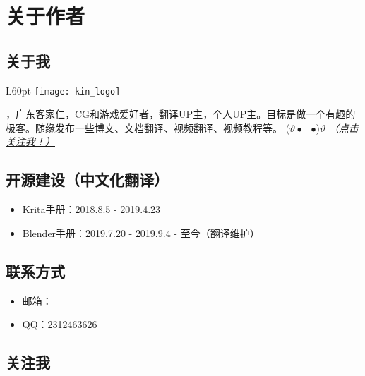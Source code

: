 \chapter*{关于作者}

\section*{关于我}
\begin{wrapfigure}[3]{L}{60pt}
    \vspace*{-15pt}
    \centering
    \texttt{[image: kin\_logo]}
\end{wrapfigure}
\textbf{\the\AuthorName}，广东客家仁，CG和游戏爱好者，翻译UP主，个人UP主。目标是做一个有趣的极客。随缘发布一些博文、文档翻译、视频翻译、视频教程等。 ($\vartheta\bullet$\_$\bullet$)$\vartheta$ \hyperlink{follow}{\emph{（点击关注我！）}}

\section*{开源建设（中文化翻译）}
\begin{itemize}
    \item \href{https://docs.krita.org/zh_CN/}{Krita手册}：2018.8.5 - \href{https://crowdin.com/profile}{2019.4.23}
    \item \href{https://docs.blender.org/manual/zh-hans/latest/}{Blender手册}：2019.7.20 - \href{https://www.blendercn.org/5812.html?tdsourcetag=s_pctim_aiomsg}{2019.9.4} - 至今（\href{https://developer.blender.org/p/Mr_Kin/}{翻译维护}）
\end{itemize}

\section*{\hypertarget{contact}{联系方式}}

\begin{itemize}
    \item 邮箱：\href{mailto:\the\AuthorEmail}{\the\AuthorEmail}
    \item QQ：\href{tencent://AddContact/?fromId=45&fromSubId=1&subcmd=all&uin=2312463626&website=www.oicqzone.com}{2312463626}
\end{itemize}

\section*{\hypertarget{follow}{关注我}}

